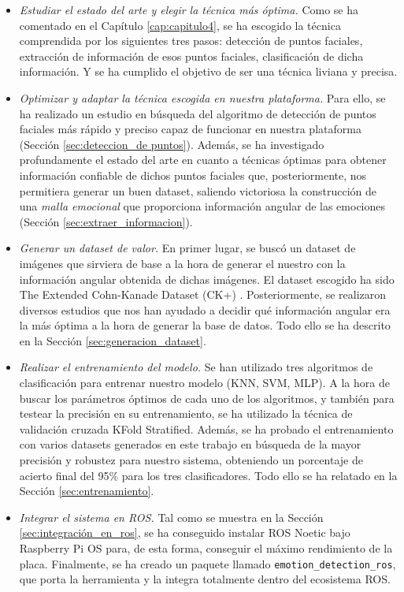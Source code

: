 \begin{itemize}
    \item \textit{Estudiar el estado del arte y elegir la técnica más óptima.} Como se ha comentado en el Capítulo \ref{cap:capitulo4}, se ha escogido la técnica comprendida por los siguientes tres pasos: detección de puntos faciales, extracción de información de esos puntos faciales, clasificación de dicha información. Y se ha cumplido el objetivo de ser una técnica liviana y precisa.
    
    \item \textit{Optimizar y adaptar la técnica escogida en nuestra plataforma.} Para ello, se ha realizado un estudio en búsqueda del algoritmo de detección de puntos faciales más rápido y preciso capaz de funcionar en nuestra plataforma (Sección \ref{sec:deteccion_de puntos}). Además, se ha investigado profundamente el estado del arte en cuanto a técnicas óptimas para obtener información confiable de dichos puntos faciales que, posteriormente, nos permitiera generar un buen dataset, saliendo victoriosa la construcción de una \textit{malla emocional} \cite{mediapipe_emotions} que proporciona información angular de las emociones (Sección \ref{sec:extraer_informacion}).
    
    \item \textit{Generar un dataset de valor.} En primer lugar, se buscó un dataset de imágenes que sirviera de base a la hora de generar el nuestro con la información angular obtenida de dichas imágenes. El dataset escogido ha sido The Extended Cohn-Kanade Dataset (CK+) \cite{Kanade1}\cite{Kanade2}. Posteriormente, se realizaron diversos estudios que nos han ayudado a decidir qué información angular era la más óptima a la hora de generar la base de datos. Todo ello se ha descrito en la Sección \ref{sec:generacion_dataset}.
    
    \item \textit{Realizar el entrenamiento del modelo.} Se han utilizado tres algoritmos de clasificación para entrenar nuestro modelo (KNN, SVM, MLP). A la hora de buscar los parámetros óptimos de cada uno de los algoritmos, y también para testear la precisión en su entrenamiento, se ha utilizado la técnica de validación cruzada KFold Stratified. Además, se ha probado el entrenamiento con varios datasets generados en este trabajo en búsqueda de la mayor precisión y robustez para nuestro sistema, obteniendo un porcentaje de acierto final del 95\% para los tres clasificadores. Todo ello se ha relatado en la Sección \ref{sec:entrenamiento}.
    
    \item \textit{Integrar el sistema en ROS.} Tal como se muestra en la Sección \ref{sec:integración_en_ros}, se ha conseguido instalar ROS Noetic bajo Raspberry Pi OS para, de esta forma, conseguir el máximo rendimiento de la placa. Finalmente, se ha creado un paquete llamado \verb|emotion_detection_ros|, que porta la herramienta y la integra totalmente dentro del ecosistema ROS.
\end{itemize}

